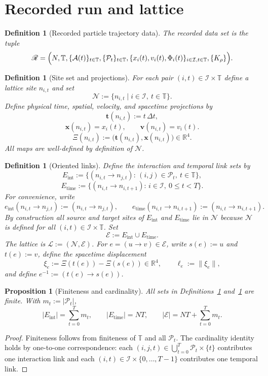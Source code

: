 \documentclass[11pt]{article}
\newtheorem{definition}[theorem]{Definition}
\newtheorem{proposition}[theorem]{Proposition}
\theoremstyle{remark}
\newcommand{\R}{\mathbb R}
\newcommand{\Tset}{\mathbb T}
\newcommand{\mcN}{\mathcal N}
\newcommand{\mcE}{\mathcal E}
\begin{document}
\section{Recorded run and lattice}
\label{sec:run}
\begin{definition}[Recorded particle trajectory data]
\label{def:run}
The recorded data set is the tuple
\[
\mathscr R=\Bigl(
N,\Tset,\{\mathcal A(t)\}_{t\in\Tset},\{\mathcal P_t\}_{t\in\Tset},
\{x_i(t),v_i(t),\Phi_i(t)\}_{i\in\mathcal I,t\in\Tset},\{K_\rho\}\Bigr).
\]
\end{definition}

\begin{definition}[Site set and projections]
\label{def:sites}
For each pair $(i,t)\in\mathcal I\times\Tset$ define a lattice site $n_{i,t}$ and set
\[
\mcN:=\{n_{i,t}\mid i\in\mathcal I,\ t\in\Tset\}.
\]
Define physical time, spatial, velocity, and spacetime projections by
\[
\mathbf t(n_{i,t}) := t\,\Delta t,
\]
\[
\mathbf x(n_{i,t})=x_i(t),\qquad \mathbf v(n_{i,t})=v_i(t).
\]
\[
\Xi(n_{i,t}):=\bigl(\mathbf t(n_{i,t}),\mathbf x(n_{i,t})\bigr)\in\R^4.
\]
All maps are well-defined by definition of $\mcN$.
\end{definition}

\begin{definition}[Oriented links]
\label{def:links}
Define the interaction and temporal link sets by
\[
E_{\mathrm{int}}:=\{(n_{i,t}\to n_{j,t}):\,(i,j)\in\mathcal P_t,\ t\in\Tset\},
\]
\[
E_{\mathrm{time}}:=\{(n_{i,t}\to n_{i,t+1}):\,i\in\mathcal I,\ 0\le t<T\}.
\]
For convenience, write
\[
e_{\mathrm{int}}(n_{i,t}\to n_{j,t}) := (n_{i,t}\to n_{j,t}),
\qquad
e_{\mathrm{time}}(n_{i,t}\to n_{i,t+1}) := (n_{i,t}\to n_{i,t+1}).
\]
By construction all source and target sites of $E_{\mathrm{int}}$ and
$E_{\mathrm{time}}$ lie in $\mcN$ because $\mcN$ is defined for all
$(i,t)\in\mathcal I\times\Tset$.
Set
\[
\mcE:=E_{\mathrm{int}}\cup E_{\mathrm{time}}.
\]
The lattice is $\mathcal L:=(\mcN,\mcE)$.
For $e=(u\to v)\in\mcE$, write $s(e):=u$ and $t(e):=v$, define the
spacetime displacement
\[
\xi_e:=\Xi(t(e))-\Xi(s(e))\in\R^4,
\qquad
\ell_e:=\|\xi_e\|,
\]
and define $e^{-1}:=(t(e)\to s(e))$.
\end{definition}

\begin{proposition}[Finiteness and cardinality]
\label{prop:finiteness}
All sets in Definitions~\ref{def:run} and~\ref{def:links} are finite.
With $m_t:=|\mathcal P_t|$,
\[
|E_{\mathrm{int}}|=\sum_{t=0}^{T}m_t,
\qquad
|E_{\mathrm{time}}|=NT,
\qquad
|\mcE|=NT+\sum_{t=0}^{T}m_t.
\]
\end{proposition}
\begin{proof}
Finiteness follows from finiteness of $\Tset$ and all $\mathcal P_t$.
The cardinality identity holds by one-to-one correspondence: each
$(i,j,t)\in\bigcup_{t=0}^{T}\mathcal P_t\times\{t\}$ contributes one interaction
link and each $(i,t)\in\mathcal I\times\{0,\dots,T-1\}$ contributes one temporal
link.
\end{proof}
\end{document}
